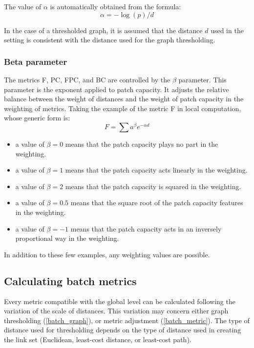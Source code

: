 \documentclass{article}
\begin{document}
The value of $\alpha$ is automatically obtained from the formula:
\begin{equation*}
\alpha =-\log \left(p\right)/{d}
\end{equation*}

In the case of a thresholded graph, it is assumed that the distance $d$ used in the setting is consistent with the distance used for the graph thresholding.  

\subsubsection{Beta parameter}

The metrics F, PC, FPC, and BC are controlled by the $\beta$ parameter. This parameter is the exponent applied to patch capacity. It adjusts the relative balance between the weight of distances and the weight of patch capacity in the weighting of metrics. Taking the example of the metric F in local computation, whose generic form is:
\begin{equation*}
F=\sum {{a}^{\beta }}{e}^{-\mathit{\alpha d}}
\end{equation*}

\begin{itemize}
	\item a value of $\beta =0$ means that the patch capacity plays no part in the weighting.
	\item a value of $\beta =1$ means that the patch capacity acts linearly in the weighting.
	\item a value of $\beta =2$ means that the patch capacity is squared in the weighting.
	\item a value of $\beta =0.5$ means that the square root of the patch capacity features in the weighting.
	\item a value of $\beta =-1$ means that the patch capacity acts in an inversely proportional way in the weighting.	
\end{itemize}

In addition to these few examples, any weighting values are possible.

\subsection{Calculating batch metrics}

Every metric compatible with the global level can be calculated following the variation of the scale of distances. This variation may concern either graph thresholding (\ref{batch_graph}), or metric adjustment (\ref{batch_metric}). The type of distance used for thresholding depends on the type of distance used in creating the link set (Euclidean, least-cost
distance, or least-cost path).
\end{document}
